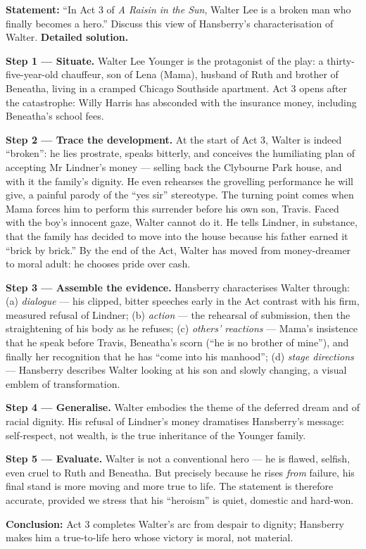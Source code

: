 \documentclass[11pt]{article}
\newcommand{\cle}[1]{{\popxbold\color{popdark}#1}}
\begin{document}
\begin{exoresolu}
\textbf{Statement:} ``In Act 3 of \emph{A Raisin in the Sun}, Walter Lee is a broken man who finally becomes a hero.'' Discuss this view of Hansberry's characterisation of Walter.
\tcblower
\textbf{Detailed solution.}

\textbf{Step 1 — Situate.} Walter Lee Younger is the protagonist of the play: a thirty-five-year-old chauffeur, son of Lena (Mama), husband of Ruth and brother of Beneatha, living in a cramped Chicago Southside apartment. Act 3 opens after the catastrophe: Willy Harris has absconded with the insurance money, including Beneatha's school fees.

\textbf{Step 2 — Trace the development.} At the start of Act 3, Walter is indeed ``broken'': he lies prostrate, speaks bitterly, and conceives the humiliating plan of accepting Mr Lindner's money — selling back the Clybourne Park house, and with it the family's dignity. He even rehearses the grovelling performance he will give, a painful parody of the ``yes sir'' stereotype. The turning point comes when Mama forces him to perform this surrender before his own son, Travis. Faced with the boy's innocent gaze, Walter cannot do it. He tells Lindner, in substance, that the family has decided to move into the house because his father earned it ``brick by brick.'' By the end of the Act, Walter has moved from money-dreamer to moral adult: he chooses \cle{pride} over cash.

\textbf{Step 3 — Assemble the evidence.} Hansberry characterises Walter through: (a) \emph{dialogue} — his clipped, bitter speeches early in the Act contrast with his firm, measured refusal of Lindner; (b) \emph{action} — the rehearsal of submission, then the straightening of his body as he refuses; (c) \emph{others' reactions} — Mama's insistence that he speak before Travis, Beneatha's scorn (``he is no brother of mine''), and finally her recognition that he has ``come into his manhood''; (d) \emph{stage directions} — Hansberry describes Walter looking at his son and slowly changing, a visual emblem of transformation.

\textbf{Step 4 — Generalise.} Walter embodies the theme of the deferred dream and of racial dignity. His refusal of Lindner's money dramatises Hansberry's message: self-respect, not wealth, is the true inheritance of the Younger family.

\textbf{Step 5 — Evaluate.} Walter is not a conventional hero — he is flawed, selfish, even cruel to Ruth and Beneatha. But precisely because he rises \emph{from} failure, his final stand is more moving and more true to life. The statement is therefore accurate, provided we stress that his ``heroism'' is quiet, domestic and hard-won.

\textbf{Conclusion:} Act 3 completes Walter's arc from despair to dignity; Hansberry makes him a true-to-life hero whose victory is moral, not material.
\end{exoresolu}
\end{document}
